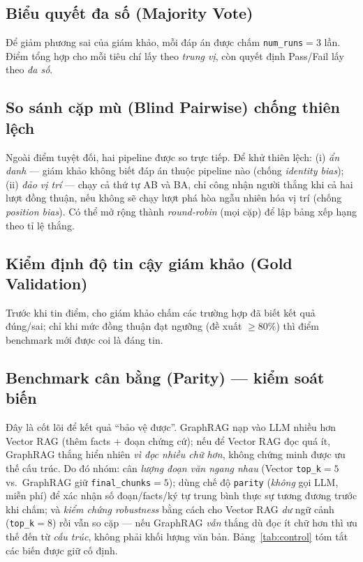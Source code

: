 \documentclass[conference]{IEEEtran}
\begin{document}
\subsection{Biểu quyết đa số (Majority Vote)}
Để giảm phương sai của giám khảo, mỗi đáp án được chấm \texttt{num\_runs}$=3$ lần. Điểm tổng hợp cho mỗi tiêu chí lấy theo \emph{trung vị}, còn quyết định Pass/Fail lấy theo \emph{đa số}.

\subsection{So sánh cặp mù (Blind Pairwise) chống thiên lệch}
Ngoài điểm tuyệt đối, hai pipeline được so trực tiếp. Để khử thiên lệch: (i) \emph{ẩn danh} --- giám khảo không biết đáp án thuộc pipeline nào (chống \emph{identity bias}); (ii) \emph{đảo vị trí} --- chạy cả thứ tự AB và BA, chỉ công nhận người thắng khi cả hai lượt đồng thuận, nếu không sẽ chạy lượt phá hòa ngẫu nhiên hóa vị trí (chống \emph{position bias}). Có thể mở rộng thành \emph{round-robin} (mọi cặp) để lập bảng xếp hạng theo tỉ lệ thắng.

\subsection{Kiểm định độ tin cậy giám khảo (Gold Validation)}
Trước khi tin điểm, cho giám khảo chấm các trường hợp đã biết kết quả đúng/sai; chỉ khi mức đồng thuận đạt ngưỡng (đề xuất $\geq 80\%$) thì điểm benchmark mới được coi là đáng tin.

\subsection{Benchmark cân bằng (Parity) --- kiểm soát biến}
Đây là cốt lõi để kết quả ``bảo vệ được''. GraphRAG nạp vào LLM nhiều hơn Vector RAG (thêm facts + đoạn chứng cứ); nếu để Vector RAG đọc quá ít, GraphRAG thắng hiển nhiên \emph{vì đọc nhiều chữ hơn}, không chứng minh được ưu thế cấu trúc. Do đó nhóm: cân \emph{lượng đoạn văn ngang nhau} (Vector \texttt{top\_k}$=5$ vs.\ GraphRAG giữ \texttt{final\_chunks}$=5$); dùng chế độ \texttt{parity} (\emph{không} gọi LLM, miễn phí) để xác nhận số đoạn/facts/ký tự trung bình thực sự tương đương trước khi chấm; và \emph{kiểm chứng robustness} bằng cách cho Vector RAG \emph{dư} ngữ cảnh (\texttt{top\_k}$=8$) rồi vẫn so cặp --- nếu GraphRAG \emph{vẫn} thắng dù đọc ít chữ hơn thì ưu thế đến từ \emph{cấu trúc}, không phải khối lượng văn bản. Bảng~\ref{tab:control} tóm tắt các biến được giữ cố định.
\end{document}
